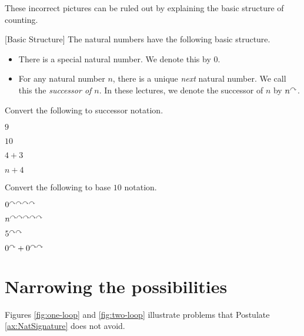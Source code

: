 These incorrect pictures can be ruled out by explaining the basic structure of counting.

\ipadbreak

\begin{postulate}\label{sig:NatSignature}[Basic Structure]
The natural numbers have the following basic structure.
  \begin{itemize}
  \item There is a special natural number. We denote this by $0$.
  \item For any natural number $n$, there is
    a unique \emph{next} natural number. We call this the \emph{successor of $n$}. 
    In these lectures, we denote the successor of $n$ by $n^\curvearrowright$.
  \end{itemize}
\end{postulate}

\begin{exercises}
\begin{multicols}{2}
\item Convert the following to successor notation.
  \begin{exerciselist}
  \item $9$
  \item $10$
  \item $4 + 3$
  \item $n + 4$
  \end{exerciselist}
\item Convert the following to base $10$ notation.
\begin{exerciselist}
\item $0^{\curvearrowright\curvearrowright\curvearrowright\curvearrowright}$
\item $n^{\curvearrowright\curvearrowright\curvearrowright\curvearrowright\curvearrowright}$
\item $5^{\curvearrowright\curvearrowright}$
\item $0^\curvearrowright + 0^{\curvearrowright\curvearrowright}$
\end{exerciselist}
\end{multicols}
\end{exercises}

\ipadbreak

\section{Narrowing the possibilities}

Figures \ref{fig:one-loop} and \ref{fig:two-loop} illustrate 
problems that Postulate \ref{ax:NatSignature} does not avoid.

